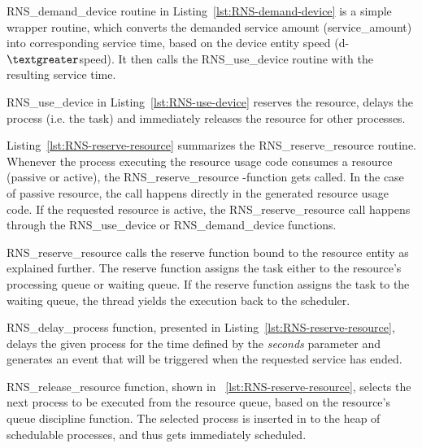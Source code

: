 RNS\_demand\_device routine in Listing~\ref{lst:RNS-demand-device} is a simple wrapper routine, which converts the demanded service amount (service\_amount) into corresponding service time, based on the device entity speed (d-$\textgreater$speed). It then calls the RNS\_use\_device routine with the resulting service time.



RNS\_use\_device in Listing~\ref{lst:RNS-use-device} reserves the resource, delays the process (i.e. the task) and immediately releases the resource for other processes.



Listing~\ref{lst:RNS-reserve-resource} summarizes the RNS\_reserve\_resource routine. Whenever the process executing the resource usage code consumes a resource (passive or active), the RNS\_reserve\_resource -function gets called. In the case of passive resource, the call happens directly in the generated resource usage code. If the requested resource is active, the RNS\_reserve\_resource call happens through the RNS\_use\_device or RNS\_demand\_device functions.

RNS\_reserve\_resource calls the reserve function bound to the resource entity as explained further. The reserve function assigns the task either to the resource's processing queue or waiting queue. If the reserve function assigns the task to the waiting queue, the thread yields the execution back to the scheduler.



RNS\_delay\_process function, presented in Listing~\ref{lst:RNS-reserve-resource}, delays the given process for the time defined by the \emph{seconds} parameter and generates an event that will be triggered when the requested service has ended.



RNS\_release\_resource function, shown in ~\ref{lst:RNS-reserve-resource}, selects the next process to be executed from the resource queue, based on the resource's queue discipline function. The selected process is inserted in to the heap of schedulable processes, and thus gets immediately scheduled.

